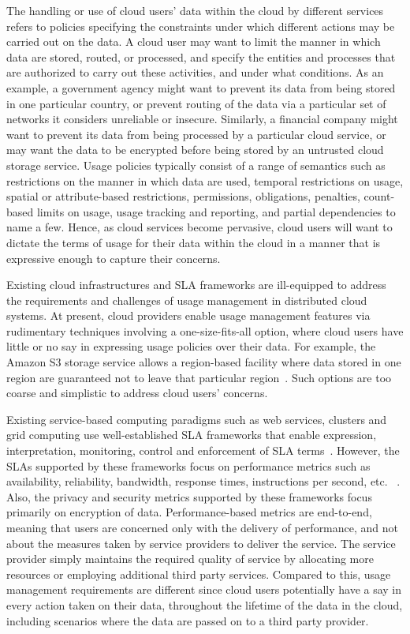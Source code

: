 \documentclass[10pt, conference, compsocconf]{IEEEtran}
\begin{document}
The handling or use of cloud users' data within the cloud by different services refers to policies specifying the constraints under which different actions may be carried out on the data. A cloud user may want to limit the manner in which data are stored, routed, or processed, and specify the entities and processes that are authorized to carry out these activities, and under what conditions. As an example, a government agency might want to prevent its data from being stored in one particular country, or prevent routing of the data via a particular set of networks it considers unreliable or insecure. Similarly, a financial company might want to prevent its data from being processed by a particular cloud service, or may want the data to be encrypted before being stored by an untrusted cloud storage service. Usage policies typically consist of a range of semantics such as restrictions on the manner in which data are used, temporal restrictions on usage, spatial or attribute-based restrictions, permissions, obligations, penalties, count-based limits on usage, usage tracking and reporting, and partial dependencies to name a few.   Hence, as cloud services become pervasive, cloud users will want to dictate the terms of usage for their data within the cloud in a manner that is expressive enough to capture their concerns. 


Existing cloud infrastructures and SLA frameworks are ill-equipped to address the requirements and challenges of usage management in distributed cloud systems. At present, cloud providers enable usage management features via rudimentary techniques involving a  one-size-fits-all option, where cloud users have little or no say in expressing usage policies over their data. For example, the Amazon S3 storage service allows a region-based facility where data stored in one region are guaranteed not to leave that particular region~\cite{AWS}. Such options are too coarse and simplistic to address cloud users' concerns. 

Existing service-based computing paradigms such as web services, clusters and grid computing use well-established SLA frameworks that enable expression, interpretation, monitoring, control and enforcement of SLA terms~\cite{WSA, WSLA, WSP,PaRaSh:09}. However, the SLAs supported by these frameworks focus on performance metrics such as availability, reliability, bandwidth, response times, instructions per second, etc. ~\cite{PaSc:06}. Also, the privacy and security metrics supported by these frameworks focus primarily on encryption of data. Performance-based metrics are end-to-end, meaning that users are concerned only with the delivery of performance, and not about the measures taken by service providers to deliver the service. The service provider simply maintains the required quality of service by allocating more resources or employing additional third party services. Compared to this, usage management requirements are different since cloud users potentially have a say in every action taken on their data, throughout the lifetime of the data in the cloud, including scenarios where the data are passed on to a third party provider. 
\end{document}
